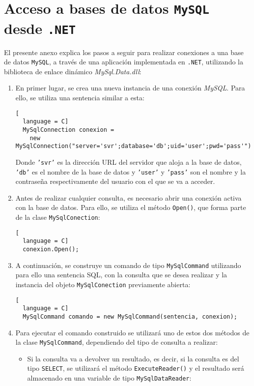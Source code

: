 \chapter{Acceso a bases de datos \texttt{MySQL} desde \texttt{.NET}}
\label{chap:mySQL}

El presente anexo explica los pasos a seguir para realizar conexiones a una
base de datos \texttt{MySQL}, a través de una aplicación implementada en
\texttt{.NET}, utilizando la biblioteca de enlace dinámico
\emph{MySql.Data.dll}:

\begin{enumerate}
\item En primer lugar, se crea una nueva instancia de una conexión
\emph{MySQL}. Para ello, se utiliza una sentencia similar a esta:

\begin{lstlisting}[
  language = C]
  MySqlConnection conexion =
    new MySqlConnection("server='svr';database='db';uid='user';pwd='pass'");
\end{lstlisting}

Donde \texttt{'svr'} es la dirección \acs{URL} del servidor que aloja a la base
de datos, \texttt{'db'} es el nombre de la base de datos y \texttt{'user'} y
\texttt{'pass'} son el nombre y la contraseña respectivamente del usuario
con el que se va a acceder.

\item Antes de realizar cualquier consulta, es necesario
abrir una conexión activa con la base de datos. Para ello, se utiliza el
método \texttt{Open()}, que forma parte de la clase \texttt{MySqlConection}:

\begin{lstlisting}[
  language = C]
  conexion.Open();
\end{lstlisting}

\item A continuación, se construye un comando de tipo \texttt{MySqlCommand}
utilizando para ello una sentencia \acs{SQL}, con la consulta que se desea
realizar y la instancia del objeto \texttt{MySqlConection} previamente
abierta:

\begin{lstlisting}[
  language = C]
  MySqlCommand comando = new MySqlCommand(sentencia, conexion);
\end{lstlisting}

\item Para ejecutar el comando construido se utilizará uno de estos dos métodos
de la clase \texttt{MySqlCommand}, dependiendo del tipo de consulta a realizar:
\begin{itemize}
\item Si la consulta va a devolver un resultado, es decir, si la consulta
es del tipo \texttt{SELECT}, se utilizará el método \texttt{ExecuteReader()}
y el resultado será almacenado en una variable de tipo
\texttt{MySqlDataReader}:


\end{itemize}
\end{enumerate}

